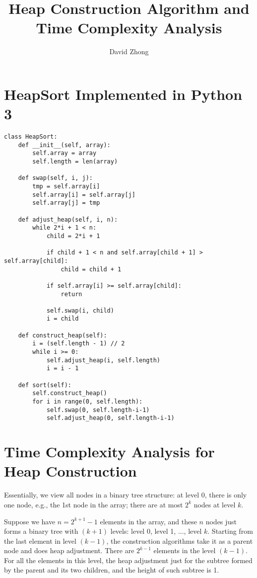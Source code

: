 \documentclass[11pt, oneside]{article}   	%
\title{Heap Construction Algorithm and Time Complexity Analysis}
\author{David Zhong}
\begin{document}
\maketitle

\section{HeapSort Implemented in Python 3}
\begin{verbatim}
class HeapSort:
    def __init__(self, array):
        self.array = array
        self.length = len(array)

    def swap(self, i, j):
        tmp = self.array[i]
        self.array[i] = self.array[j]
        self.array[j] = tmp

    def adjust_heap(self, i, n):
        while 2*i + 1 < n:
            child = 2*i + 1
            
            if child + 1 < n and self.array[child + 1] > self.array[child]:
                child = child + 1

            if self.array[i] >= self.array[child]:
                return
            
            self.swap(i, child)
            i = child
        
    def construct_heap(self):
        i = (self.length - 1) // 2
        while i >= 0:
            self.adjust_heap(i, self.length)
            i = i - 1

    def sort(self):
        self.construct_heap()
        for i in range(0, self.length):
            self.swap(0, self.length-i-1)
            self.adjust_heap(0, self.length-i-1)

\end{verbatim}

\newpage
\section{Time Complexity Analysis for Heap Construction}
Essentially, we view all nodes in a binary tree structure: at level 0, there is only one node, e.g., the 1st node in the array;  there are at most $2^k$ nodes at level $k$.

Suppose we have $n = 2^{k+1}-1$ elements in the array, and these $n$ nodes just forms a binary tree with $(k+1)$ levels: level 0, level 1, ..., level $k$. Starting from the last element in level $(k-1)$, the construction algorithms take it as a parent node and does heap adjustment. There are $2^{k-1}$ elements in the level $(k-1)$. For all the elements in this level, the heap adjustment just for the subtree formed by the parent and its two children, and the height of such subtree is 1.
\end{document}
